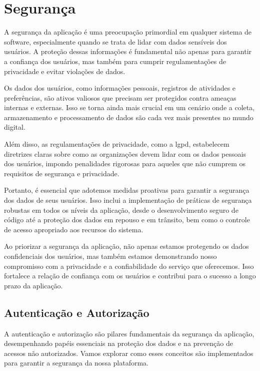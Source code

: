 \section{Segurança}

A segurança da aplicação é uma preocupação primordial em qualquer sistema de software, especialmente quando se trata de lidar com dados sensíveis dos usuários. A proteção dessas informações é fundamental não apenas para garantir a confiança dos usuários, mas também para cumprir regulamentações de privacidade e evitar violações de dados.

Os dados dos usuários, como informações pessoais, registros de atividades e preferências, são ativos valiosos que precisam ser protegidos contra ameaças internas e externas. Isso se torna ainda mais crucial em um cenário onde a coleta, armazenamento e processamento de dados são cada vez mais presentes no mundo digital.

Além disso, as regulamentações de privacidade, como a \ac{lgpd}, estabelecem diretrizes claras sobre como as organizações devem lidar com os dados pessoais dos usuários, impondo penalidades rigorosas para aqueles que não cumprem os requisitos de segurança e privacidade.

Portanto, é essencial que adotemos medidas proativas para garantir a segurança dos dados de seus usuários. Isso inclui a implementação de práticas de segurança robustas em todos os níveis da aplicação, desde o desenvolvimento seguro de código até a proteção dos dados em repouso e em trânsito, bem como o controle de acesso apropriado aos recursos do sistema.

Ao priorizar a segurança da aplicação, não apenas estamos protegendo os dados confidenciais dos usuários, mas também estamos demonstrando nosso compromisso com a privacidade e a confiabilidade do serviço que oferecemos. Isso fortalece a relação de confiança com os usuários e contribui para o sucesso a longo prazo da aplicação.

\subsection{Autenticação e Autorização}

A autenticação e autorização são pilares fundamentais da segurança da aplicação, desempenhando papéis essenciais na proteção dos dados e na prevenção de acessos não autorizados. Vamos explorar como esses conceitos são implementados para garantir a segurança da nossa plataforma.

